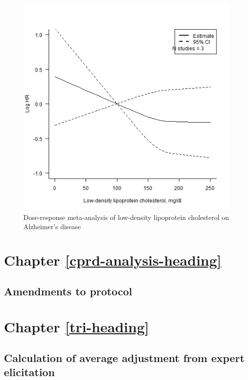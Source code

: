 \documentclass[a4paper, twoside]{templates/ociamthesis}
\begin{document}
\begin{figure}[H]
\includegraphics[width=1\linewidth]{figures/sys-rev/dr_AD_LDL} \caption[shortcap]{Dose-response meta-analysis of low-density lipoprotein cholesterol on Alzheimer's disease}\label{fig:drAdLDL}
\end{figure}

\hypertarget{appendix-cprd-analysis}{%
\section{Chapter \ref{cprd-analysis-heading}}\label{appendix-cprd-analysis}}

\hypertarget{appendix-cprd-amendments}{%
\subsection{Amendments to protocol}\label{appendix-cprd-amendments}}

\hypertarget{appendix-tri-analysis}{%
\section{Chapter \ref{tri-heading}}\label{appendix-tri-analysis}}

\hypertarget{calculation-of-average-adjustment-from-expert-elicitation}{%
\subsection{Calculation of average adjustment from expert elicitation}\label{calculation-of-average-adjustment-from-expert-elicitation}}
\end{document}
